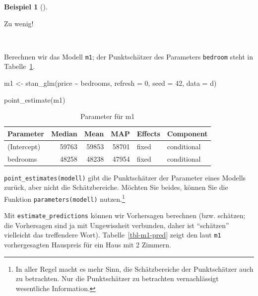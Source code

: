 \documentclass[
  ngerman,
  letterpaper,
  twoside,
  open=any]{scrbook}
\newenvironment{Shaded}{\begin{snugshade}}{\end{snugshade}}
\newcommand{\AttributeTok}[1]{\textcolor[rgb]{0.40,0.45,0.13}{#1}}
\newcommand{\DecValTok}[1]{\textcolor[rgb]{0.68,0.00,0.00}{#1}}
\newcommand{\FunctionTok}[1]{\textcolor[rgb]{0.28,0.35,0.67}{#1}}
\newcommand{\NormalTok}[1]{\textcolor[rgb]{0.00,0.23,0.31}{#1}}
\newcommand{\OtherTok}[1]{\textcolor[rgb]{0.00,0.23,0.31}{#1}}
\newcommand{\SpecialCharTok}[1]{\textcolor[rgb]{0.37,0.37,0.37}{#1}}
\theoremstyle{definition}
\newtheorem{example}{Beispiel}[chapter]
\theoremstyle{plain}
\theoremstyle{definition}
\theoremstyle{definition}
\theoremstyle{remark}
\begin{document}
\begin{example}[]
\begin{displayquote}
Zu wenig! 🤬
\end{displayquote}

🧑

Berechnen wir das Modell \texttt{m1}; der Punktschätzer des Parameters
\texttt{bedroom} steht in Tabelle~\ref{tbl-m1-hdi}.

\begin{Shaded}
\begin{Highlighting}[]
\NormalTok{m1 }\OtherTok{\textless{}{-}} \FunctionTok{stan\_glm}\NormalTok{(price }\SpecialCharTok{\textasciitilde{}}\NormalTok{ bedrooms,}
               \AttributeTok{refresh =} \DecValTok{0}\NormalTok{,}
               \AttributeTok{seed =} \DecValTok{42}\NormalTok{,}
               \AttributeTok{data =}\NormalTok{ d)}

\FunctionTok{point\_estimate}\NormalTok{(m1)}
\end{Highlighting}
\end{Shaded}

{

\begin{longtable}[]{@{}lrrrll@{}}

\caption{\label{tbl-m1-hdi}Parameter für m1}

\tabularnewline

\toprule\noalign{}
Parameter & Median & Mean & MAP & Effects & Component \\
\midrule\noalign{}
\endhead
\bottomrule\noalign{}
\endlastfoot
(Intercept) & 59763 & 59853 & 58701 & fixed & conditional \\
bedrooms & 48258 & 48238 & 47954 & fixed & conditional \\

\end{longtable}

}

\texttt{point\_estimates(modell)} gibt die Punktschätzer der Parameter
eines Modells zurück, aber nicht die Schätzbereiche. Möchten Sie beides,
können Sie die Funktion \texttt{parameters(modell)} nutzen.\footnote{In
  aller Regel macht es mehr Sinn, die Schätzbereiche der Punktschätzer
  auch zu betrachten. Nur die Punktschätzer zu betrachten vernachlässigt
  wesentliche Information.}

Mit \texttt{estimate\_predictions} können wir Vorhersagen berechnen
(bzw. schätzen; die Vorhersagen sind ja mit Ungewissheit verbunden,
daher ist \enquote{schätzen} vielleicht das treffendere Wort).
Tabelle~\ref{tbl-m1-pred} zeigt den laut \texttt{m1} vorhergesagten
Hauspreis für ein Haus mit 2 Zimmern.


\end{example}
\end{document}
